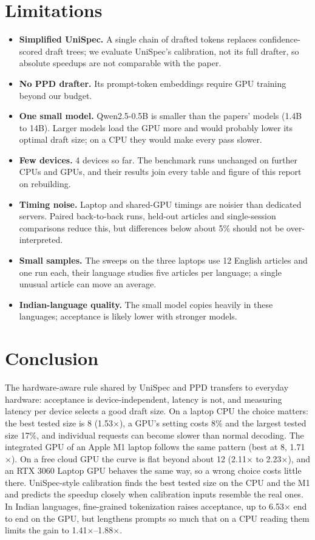 \documentclass[11pt,a4paper]{article}
\begin{document}
\section{Limitations}
\begin{itemize}
  \item \textbf{Simplified UniSpec.} A single chain of drafted tokens replaces confidence-scored draft trees; we evaluate UniSpec's calibration, not its full drafter, so absolute speedups are not comparable with the paper.
  \item \textbf{No PPD drafter.} Its prompt-token embeddings require GPU training beyond our budget.
  \item \textbf{One small model.} Qwen2.5-0.5B is smaller than the papers' models (1.4B to 14B). Larger models load the GPU more and would probably lower its optimal draft size; on a CPU they would make every pass slower.
  \item \textbf{Few devices.} 4 devices so far. The benchmark runs unchanged on further CPUs and GPUs, and their results join every table and figure of this report on rebuilding.
  \item \textbf{Timing noise.} Laptop and shared-GPU timings are noisier than dedicated servers. Paired back-to-back runs, held-out articles and single-session comparisons reduce this, but differences below about 5\% should not be over-interpreted.
  \item \textbf{Small samples.} The sweeps on the three laptops use 12 English articles and one run each, their language studies five articles per language; a single unusual article can move an average.
  \item \textbf{Indian-language quality.} The small model copies heavily in these languages; acceptance is likely lower with stronger models.
\end{itemize}
\section{Conclusion}
The hardware-aware rule shared by UniSpec and PPD transfers to everyday hardware: acceptance is device-independent, latency is not, and measuring latency per device selects a good draft size. On a laptop CPU the choice matters: the best tested size is 8 (1.53$\times$), a GPU's setting costs 8\% and the largest tested size 17\%, and individual requests can become slower than normal decoding. The integrated GPU of an Apple M1 laptop follows the same pattern (best at 8, 1.71$\times$). On a free cloud GPU the curve is flat beyond about 12 (2.11$\times$ to 2.23$\times$), and an RTX 3060 Laptop GPU behaves the same way, so a wrong choice costs little there. UniSpec-style calibration finds the best tested size on the CPU and the M1 and predicts the speedup closely when calibration inputs resemble the real ones. In Indian languages, fine-grained tokenization raises acceptance, up to 6.53$\times$ end to end on the GPU, but lengthens prompts so much that on a CPU reading them limits the gain to 1.41$\times$--1.88$\times$.
\end{document}
